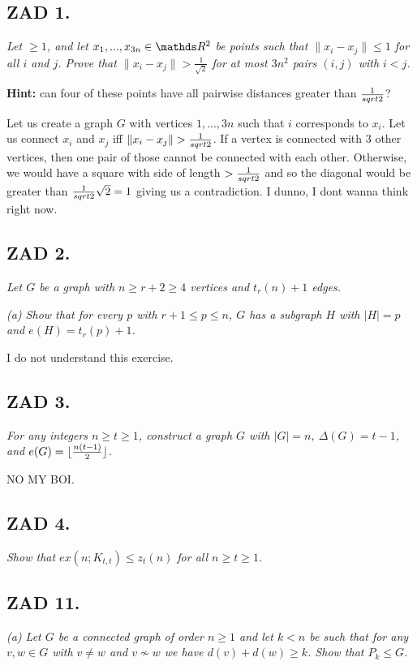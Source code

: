 \documentclass{article}[13pt]
\begin{document}
\subsection*{ZAD 1.}
\emph{Let $\geq1$, and let $x_1,...,x_{3n}\in\R^2$ be points such that $\|x_i-x_j\|\leq1$ for all $i$ and $j$. Prove that $\|x_i-x_j\|>\frac1{\sqrt{2}}$ for at most $3n^2$ pairs $(i,j)$ with $i<j$.}

\textbf{Hint:} can four of these points have all pairwise distances greater than ${1\over sqrt{2}}$?
\medskip

Let us create a graph $G$ with vertices $1,...,3n$ such that $i$ corresponds to $x_i$. Let us connect $x_i$ and $x_j$ iff $\|x_i-x_j\|>{1\over sqrt2}$. If a vertex is connected with $3$ other vertices, then one pair of those cannot be connected with each other. Otherwise, we would have a square with side of length $>{1\over sqrt2}$ and so the diagonal would be greater than ${1\over sqrt2}\sqrt2=1$ giving us a contradiction. I dunno, I dont wanna think right now.

\subsection*{ZAD 2.}
\emph{Let $G$ be a graph with $n\geq r+2\geq 4$ vertices and $t_r(n)+1$ edges.}

\emph{(a) Show that for every $p$ with $r+1\leq p\leq n$, $G$ has a subgraph $H$ with $|H|=p$ and $e(H)=t_r(p)+1$.}
\medskip

I do not understand this exercise.

\subsection*{ZAD 3.}
\emph{For any integers $n\geq t\geq1$, construct a graph $G$ with $|G|=n$, $\Delta(G)=t-1$, and $e(G)=\lfloor{n(t-1)\over2}\rfloor$.}

NO MY BOI.

\subsection*{ZAD 4.}
\emph{Show that $ex(n;K_{t,t})\leq z_t(n)$ for all $n\geq t\geq1$.}
\medskip



\subsection*{ZAD 11.}
\emph{(a) Let $G$ be a connected graph of order $n\geq1$ and let $k<n$ be such that for any $v,w\in G$ with $v\neq w$ and $v\not \sim w$ we have $d(v)+d(w)\geq k$. Show that $P_k\leq G$.}
\medskip
\end{document}
